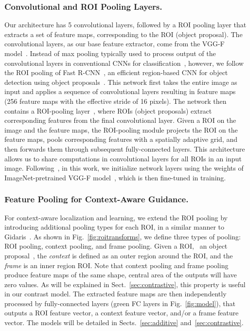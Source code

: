 \subsubsection{Convolutional and ROI Pooling Layers.} 

Our architecture has 5 convolutional layers, followed by a ROI pooling
layer that extracts a set of feature maps, corresponding to the ROI (object
proposal). The convolutional layers, as our base feature extractor, come from
the VGG-F model~\cite{Chatfield14}. 
 Instead of max pooling typically used to process output of the convolutional layers in conventional
CNNs for classification~\cite{Krizhevsky:2012wl,Oquab:2015us}, however, we
follow the ROI pooling of Fast R-CNN~\cite{Girshick_2015_ICCV}, an efficient
region-based CNN for object detection using object
proposals~\cite{uijlings2013selective}. This network first takes the
entire image as input and applies a sequence of convolutional layers resulting in feature maps (256 feature maps with the effective stride of 16 pixels). The network then contains a ROI-pooling
layer~\cite{He:2014wg}, where ROIs (object proposals) extract corresponding
features from the final convolutional layer. Given a ROI on the image and the
feature maps, the ROI-pooling module projects the ROI on the feature maps, pools
corresponding features with a spatially adaptive grid, and then forwards
them through subsequent fully-connected layers. This architecture allows us to
share computations in convolutional layers for all ROIs in an input image.
Following~\cite{Bilen:2015uo}, in this work, we initialize network layers using the weights of 
ImageNet-pretrained VGG-F model~\cite{Chatfield14}, which is then fine-tuned in training.

\subsubsection{Feature Pooling for Context-Aware Guidance.} For context-aware localization and
learning, we extend the ROI pooling by introducing additional pooling types 
for each ROI, in a similar manner to Gidaris~\etal\cite{Gidaris:2015cx}. 
As shown in Fig.~\ref{fig:roitransforms}, 
we define three types of pooling: ROI pooling, context pooling, and frame pooling. 
Given a ROI, \ie ~an object proposal~\cite{uijlings2013selective}, 
the {\it context} is defined as an outer region around the ROI, and the {\it frame} is an inner region ROI. Note that context pooling and frame pooling produce feature maps of the same shape, \ie central area of the outputs will have zero values. As will be explained in Sect.~\ref{sec:contrastive}, this property is useful in our contrast model.
The extracted feature maps are then independently
processed by fully-connected layers (green FC layers in Fig.~\ref{fig:model}), that outputs a ROI feature vector, a context feature vector, and/or a frame feature vector.   
The models will be detailed in Sects.~\ref{sec:additive}
and~\ref{sec:contrastive}. 


